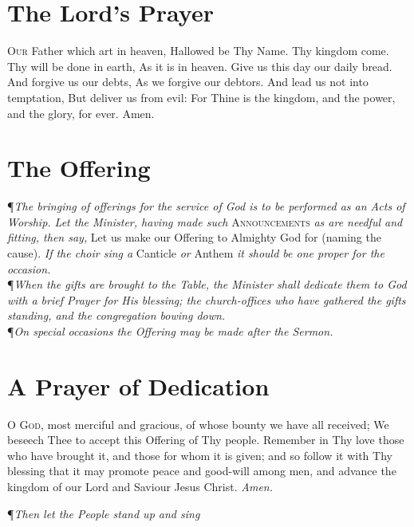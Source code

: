 \section*{The Lord's Prayer}

\lettrine{O}{ur} Father which art in heaven, Hallowed be Thy Name.
Thy kingdom come.
Thy will be done in earth, As it is in heaven.
Give us this day our daily bread.
And forgive us our debts, As we forgive our debtors.
And lead us not into temptation, But deliver us from evil:
For Thine is the kingdom, and the power, and the glory, for ever.
Amen.

\section*{The Offering}

\P \textit{The bringing of offerings for the service of God is to be performed as an Acts of Worship.
Let the Minister, having made such} \textsc{Announcements} \textit{as are needful and fitting, then say,} Let us make our Offering to Almighty God for (naming the cause).
\textit{If the choir sing a} Canticle \textit{or} Anthem \textit{it should be one proper for the occasion.} \\

\noindent\P \textit{When the gifts are brought to the Table, the Minister shall dedicate them to God with a brief Prayer for His blessing; the church-offices who have gathered the gifts standing, and the congregation bowing down.} \\

\noindent\P \textit{On special occasions the Offering may be made after the Sermon.}

\section*{A Prayer of Dedication}

\lettrine{O}{ God,} most merciful and gracious, of whose bounty we have all received; We beseech Thee to accept this Offering of Thy people.
Remember in Thy love those who have brought it, and those for whom it is given; and so follow it with Thy blessing that it may promote peace and good-will among men, and advance the kingdom of our Lord and Saviour Jesus Christ. \textit{Amen.} \\

{\centering\P \textit{Then let the People stand up and sing }\par}

